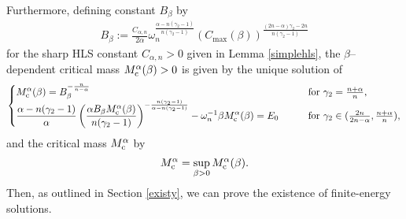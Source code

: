 \documentclass[reqno,11pt]{amsart}
\numberwithin{equation}{section}
\theoremstyle{definition}
\begin{document}
Furthermore, defining constant $B_\beta$ by
    \begin{align*}
  B_\beta := \frac{C_{\alpha,n}}{2 \alpha} \omega_n^\frac{\alpha - n(\gamma_2 - 1)}{n(\gamma_2 - 1)} (C_{\text{max}}(\beta) )^{\frac{(2n-\alpha)\gamma_2 - 2n}{n(\gamma_2 - 1)}}
    \end{align*}
    for the sharp HLS constant $C_{\alpha,n} > 0$ given in Lemma \ref{simplehls}, 
    the $\beta$--dependent critical mass $M_{\rm c}^{\alpha}(\beta) > 0$ is given 
    by the unique solution of
    \begin{align*}
  \begin{cases}
  \displaystyle
  M_{\rm c}^{\alpha}(\beta) = B_\beta^{-\frac{n}{n - \alpha}} 
 & \mbox{for $\gamma_2 = \frac{n + \alpha}{n}$}, \\
\displaystyle
\frac{\alpha - n(\gamma_2 - 1)}{\alpha} 
\left ( \frac{\alpha B_\beta M_{\rm c}^{\alpha}(\beta)}{n(\gamma_2 -1)} 
 \right)^{-\frac{n(\gamma_2 - 1)}{\alpha - n(\gamma_2 -1)}}
 -  \omega_n^{-1} \beta M_{\rm c}^{\alpha}(\beta) = E_0 
 \qquad & \mbox{for $\gamma_2 \in ( \frac{2n}{2n - \alpha}, \frac{n + \alpha}{n} )$},
  \end{cases}
    \end{align*}
    and the critical mass $M_{\rm c}^{\alpha}$ by
    \begin{align*}
  M_{\rm c}^{\alpha} = \sup_{\beta > 0} M_{\rm c}^{\alpha}(\beta).
    \end{align*}
    Then, as outlined in Section \ref{existy}, 
    we can prove the existence of finite-energy solutions. 
\end{document}
